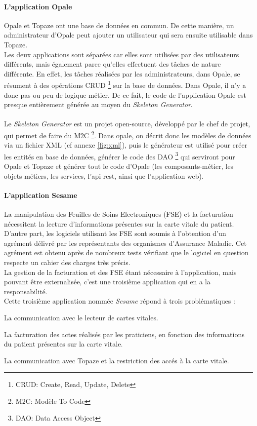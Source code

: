 \paragraph*{L'application Opale\\}
Opale et Topaze ont une base de données en commun. De cette manière, un administrateur d'Opale peut ajouter un utilisateur qui sera ensuite utilisable dans Topaze. \\
Les deux applications sont séparées car elles sont utilisées par des utilisateurs différents, mais également parce qu'elles effectuent des tâches de nature différente. En effet, les tâches réalisées par les administrateurs, dans Opale, se résument à des opérations CRUD \footnote{CRUD: Create, Read, Update, Delete} sur la base de données. Dans Opale, il n'y a donc pas ou peu de logique métier. 
De ce fait, le code de l'application Opale est presque entièrement générée au moyen du \textit{Skeleton Generator}.\\ \\
Le \textit{Skeleton Generator} est un projet open-source, développé par le chef de projet, qui permet de faire du M2C \footnote{M2C: Modèle To Code}. Dans opale, on décrit donc les modèles de données via un fichier XML (cf annexe \ref{fig:xml}), puis le générateur est utilisé pour créer les entités en base de données, générer le code des DAO \footnote{DAO: Data Access Object} qui serviront pour Opale et Topaze et générer tout le code d'Opale (les composants-métier, les objets métiers, les services, l'api rest, ainsi que l'application web). 

\paragraph*{L'application Sesame\\}

La manipulation des Feuilles de Soins Electroniques (FSE) et la facturation nécessitent la lecture d'informations présentes sur la carte vitale du patient. D'autre part, les logiciels utilisant les FSE sont soumis à l’obtention d’un agrément délivré
par les représentants des organismes d’Assurance Maladie. Cet agrément est obtenu après de
nombreux tests vérifiant que le logiciel en question respecte un cahier des charges très précis.\\
La gestion de la facturation et des FSE étant nécessaire à l’application, mais pouvant
être externalisée, c’est une troisième application qui en a la responsabilité. \\
Cette troisième application nommée \textit{Sesame} répond à trois problématiques : 
\begin{sitemize}
\item La communication avec le lecteur de cartes vitales.
\item La facturation des actes réalisés par les praticiens, en fonction des informations du patient présentes sur la carte vitale.
\item La communication avec Topaze et la restriction des accés à la carte vitale.
\end{sitemize}

